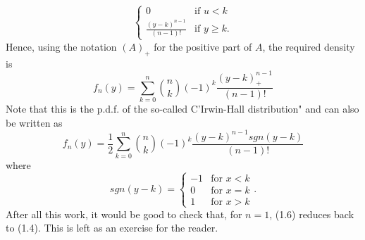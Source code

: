 \documentclass[11pt,a4paper]{article}
\begin{document}
\begin{enumerate}
\begin{enumerate}
$$      \begin{cases}
        0 & \text{if $u < k$}\\
        \frac{(y - k)^{n - 1}}{(n - 1)!} & \text{if $y\geq k$}.
      \end{cases}
      $$
      Hence, using the notation $(A)_+$ for the positive part of $A$, the required density is
      $$
      f_n(y) = \sum_{k = 0}^n\binom{n}{k}(-1)^k\frac{(y - k)^{n - 1}_+}{(n - 1)!}
      $$
      Note that this is the p.d.f. of the so-called C'Irwin-Hall distribution" and can also be written as
      $$
      f_n(y) = \frac{1}{2}\sum_{k = 0}^n\binom{n}{k}(-1)^k\frac{(y - k)^{n - 1}sgn(y - k)}{(n - 1)!}
      $$
      where
      $$
      sgn(y - k) =
      \begin{cases}
        -1 & \text{for $x < k$}\\
        0 & \text{for $x = k$}\\
        1 & \text{for $x> k$}
      \end{cases}.
      $$
      After all this work, it would be good to check that, for $n = 1$, (1.6) reduces back to (1.4). This is left as an exercise for the reader.
    \end{enumerate}
  \end{enumerate}
\end{document}
